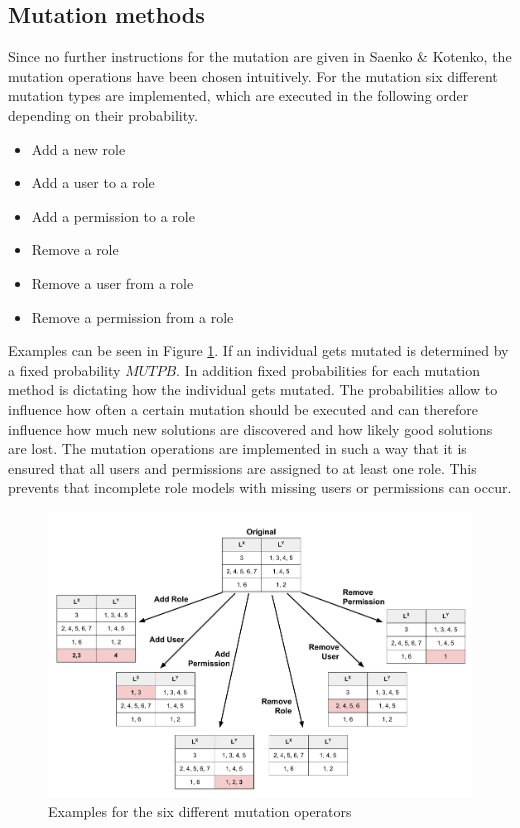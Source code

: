         \subsection{Mutation methods}
        Since no further instructions for the mutation are given in Saenko \& Kotenko\cite{saenko2012design}, the mutation operations have been chosen intuitively. For the mutation six different mutation types are implemented, which are executed in the following order depending on their probability.
        \begin{itemize}
            \setlength{\itemsep}{1pt}
            \item Add a new role
            \item Add a user to a role
            \item Add a permission to a role
            \item Remove a role
            \item Remove a user from a role
            \item Remove a permission from a role
        \end{itemize}
        Examples can be seen in Figure \ref{fig:mutationOperations}. If an individual gets mutated is determined by a fixed probability $MUTPB$. In addition fixed probabilities for each mutation method is dictating how the individual gets mutated. The probabilities allow to influence how often a certain mutation should be executed and can therefore influence how much new solutions are discovered and how likely good solutions are lost. The mutation operations are implemented in such a way that it is ensured that all users and permissions are assigned to at least one role. This prevents that incomplete role models with missing users or permissions can occur.

        \begin{figure}
            \centering
            \includegraphics[scale=0.3]{./Figures/Mutations}
            \caption{Examples for the six different mutation operators}
            \label{fig:mutationOperations}
        \end{figure}
